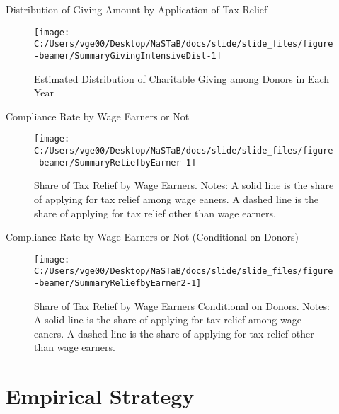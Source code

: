 \documentclass[
  ignorenonframetext,
  aspectratio=169,
]{beamer}
\begin{document}
\begin{frame}{Distribution of Giving Amount by Application of Tax Relief}
\protect\hypertarget{distribution-of-giving-amount-by-application-of-tax-relief}{}
\begin{figure}[t]

{\centering \texttt{[image: C:/Users/vge00/Desktop/NaSTaB/docs/slide/slide\_files/figure-beamer/SummaryGivingIntensiveDist-1]} 

}

\caption{Estimated Distribution of Charitable Giving among Donors in Each Year}\label{fig:SummaryGivingIntensiveDist}
\end{figure}
\end{frame}

\begin{frame}{Compliance Rate by Wage Earners or Not}
\protect\hypertarget{compliance-rate-by-wage-earners-or-not}{}
\begin{figure}[t]

{\centering \texttt{[image: C:/Users/vge00/Desktop/NaSTaB/docs/slide/slide\_files/figure-beamer/SummaryReliefbyEarner-1]} 

}

\caption{Share of Tax Relief by Wage Earners. Notes: A solid line is the share of applying for tax relief among wage eaners. A dashed line is the share of applying for tax relief other than wage earners.}\label{fig:SummaryReliefbyEarner}
\end{figure}
\end{frame}

\begin{frame}{Compliance Rate by Wage Earners or Not (Conditional on Donors)}
\protect\hypertarget{compliance-rate-by-wage-earners-or-not-conditional-on-donors}{}
\begin{figure}[t]

{\centering \texttt{[image: C:/Users/vge00/Desktop/NaSTaB/docs/slide/slide\_files/figure-beamer/SummaryReliefbyEarner2-1]} 

}

\caption{Share of Tax Relief by Wage Earners Conditional on Donors. Notes: A solid line is the share of applying for tax relief among wage eaners. A dashed line is the share of applying for tax relief other than wage earners.}\label{fig:SummaryReliefbyEarner2}
\end{figure}
\end{frame}

\hypertarget{estimation}{%
\section{Empirical Strategy}\label{estimation}}
\end{document}
